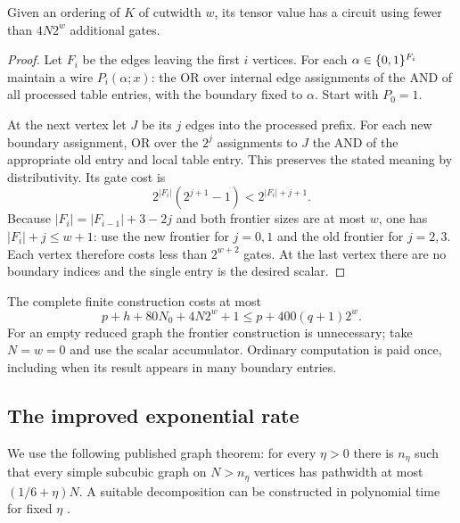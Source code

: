\begin{lemma}\label{lem:frontier}
Given an ordering of $K$ of cutwidth $w$, its tensor value has a circuit
using fewer than $4N2^w$ additional gates.
\end{lemma}
\begin{proof}
Let $F_i$ be the edges leaving the first $i$ vertices. For each
$\alpha\in\{0,1\}^{F_i}$ maintain a wire $P_i(\alpha;x)$: the OR over
internal edge assignments of the AND of all processed table entries,
with the boundary fixed to $\alpha$. Start with $P_0=1$.

At the next vertex let $J$ be its $j$ edges into the processed prefix.
For each new boundary assignment, OR over the $2^j$ assignments to
$J$ the AND of the appropriate old entry and local table entry. This
preserves the stated meaning by distributivity. Its gate cost is
\[
 2^{|F_i|}(2^{j+1}-1)<2^{|F_i|+j+1}.
\]
Because $|F_i|=|F_{i-1}|+3-2j$ and both frontier sizes are at most
$w$, one has $|F_i|+j\le w+1$: use the new frontier for $j=0,1$
and the old frontier for $j=2,3$. Each vertex therefore costs less
than $2^{w+2}$ gates. At the last vertex there are no boundary indices
and the single entry is the desired scalar.
\end{proof}

The complete finite construction costs at most
\begin{equation}\label{eq:finite-tensor-cost}
 p+h+80N_0+4N2^w+1\le p+400(q+1)2^w.
\end{equation}
For an empty reduced graph the frontier construction is unnecessary;
take $N=w=0$ and use the scalar accumulator. Ordinary computation is
paid once, including when its result appears in many boundary entries.

\subsection{The improved exponential rate}

We use the following published graph theorem: for every $\eta>0$
there is $n_\eta$ such that every simple subcubic graph on $N>n_\eta$
vertices has pathwidth at most $(1/6+\eta)N$. A suitable decomposition
can be constructed in polynomial time for fixed $\eta$
\citep[Theorem 5 and Section 4]{FominHoie2006}.

